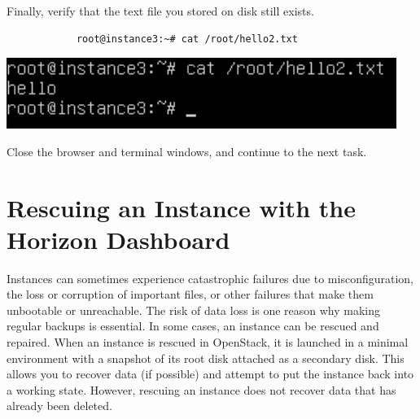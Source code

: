 \documentclass[letterpaper, 12pt]{article}
\begin{document}
\begin{enumerate}
    \begin{labstep}
        Finally, verify that the text file you stored on disk still exists.
        \begin{lstlisting}
            root@instance3:~# cat /root/hello2.txt
        \end{lstlisting}

        \begin{center}
            \includegraphics[width=\linewidth]{images/part6/step17.png}
        \end{center}
    \end{labstep}

    \begin{labstep}
        Close the browser and terminal windows, and continue to the next task.
    \end{labstep}

\end{enumerate}

\section{Rescuing an Instance with the Horizon Dashboard}\label{sec:rescuing_an_instance_with_the_horizon_dashboard}
Instances can sometimes experience catastrophic failures due to misconfiguration, the loss or corruption of important files, or other failures that make them unbootable or unreachable.
The risk of data loss is one reason why making regular backups is essential.
In some cases, an instance can be rescued and repaired.
When an instance is rescued in OpenStack, it is launched in a minimal environment with a snapshot of its root disk attached as a secondary disk.
This allows you to recover data (if possible) and attempt to put the instance back into a working state.
However, rescuing an instance does not recover data that has already been deleted.
\end{document}
